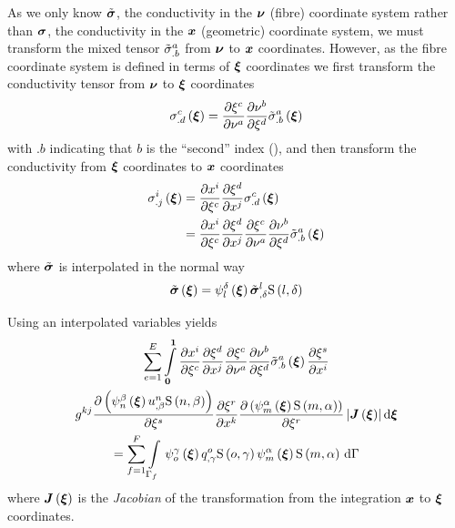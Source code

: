 As we only know $\tilde{ \boldsymbol{\mathit{ \sigma }} }$, the conductivity in the 
$ \boldsymbol{\nu} $ (fibre) coordinate system rather than $ \boldsymbol{\mathit{ \sigma }} $, the
conductivity in the $ \boldsymbol{x} $ (geometric) coordinate system, we must transform the mixed
tensor ${\tilde{ \sigma }}^{a}_{.b}$ from $ \boldsymbol{\nu} $ to $ \boldsymbol{x} $ coordinates. However, as the
fibre coordinate system is defined in terms of $ \boldsymbol{\xi} $ coordinates we
first transform the conductivity tensor from $ \boldsymbol{\nu} $ to $ \boldsymbol{\xi} $
coordinates \ie
\begin{equation}
    \sigma ^{c}_{.d}\left(  \boldsymbol{\xi}  \right) = \dfrac{\partial \xi^{c}}{\partial \nu^{a}}  \dfrac{\partial \nu^{b}}{\partial \xi^{d}} 
   {\tilde{ \sigma }}^{a}_{.b}\left(  \boldsymbol{\xi}  \right) 
\end{equation}
with $.b$ indicating that $b$ is the ``second'' index (),
and then transform the conductivity from $ \boldsymbol{\xi} $ coordinates to
$ \boldsymbol{x} $ coordinates \ie
\begin{equation}
  \begin{split}
      \sigma ^{i}_{.j}\left(  \boldsymbol{\xi}  \right)  &=
     \dfrac{\partial x^{i}}{\partial \xi^{c}}  \dfrac{\partial \xi^{d}}{\partial x^{j}} 
     { \sigma }^{c}_{.d}\left(  \boldsymbol{\xi}  \right)  \\
    &=  \dfrac{\partial x^{i}}{\partial \xi^{c}}  \dfrac{\partial \xi^{d}}{\partial x^{j}}  \dfrac{\partial \xi^{c}}{\partial \nu^{a}}  \dfrac{\partial \nu^{b}}{\partial \xi^{d}}  {\tilde{ \sigma }}^{a}_{.b}\left(  \boldsymbol{\xi}  \right) 
  \end{split}
\end{equation}
where $\tilde{ \boldsymbol{\mathit{ \sigma }} }$ is interpolated in the normal way \ie
\begin{equation}
   \tilde{ \boldsymbol{\mathit{ \sigma }} }\left(  \boldsymbol{\xi}  \right) 
  =   \psi_{l}^{\delta} \left(  \boldsymbol{\xi}  \right)    {\tilde{ \boldsymbol{\mathit{ \sigma }} }}^{l} _{,\delta} 
     \mathrm{S} \left( l,\delta \right)  
\end{equation}

Using an interpolated variables yields
\begin{multline}
  \dsum_{e=1}^{E}\dintl{\vectr{0}}{\vectr{1}}\delby{x^{i}}{\xi^{c}}
    \delby{\xi^{d}}{x^{j}}\delby{\xi^{c}}{\nu^{a}}
    \delby{\nu^{b}}{\xi^{d}}\fnof{{\tilde{\conductivitytensorsymbol}}^{a}_{.b}}{\vectr{\xi}}\delby{\xi^{s}}{x^{i}} \\
    \generalmetrictensorsymbol^{kj}\delby{\pbrac{\gbfn{n}{\beta}{\vectr{\xi}}\nodedof{u}{n}{\beta}\gsf{n}{\beta}}}{\xi^{s}}
    \delby{\xi^{r}}{x^{k}}\delby{\pbrac{\gbfn{m}{\alpha}{\vectr{\xi}}\gsf{m}{\alpha}}}{\xi^{r}}
    \abs{\fnof{\matr{J}}{\vectr{\xi}}}\exteriorderiv{\vectr{\xi}} \\ 
  = \dsum_{f=1}^{F}\gint{\Gamma_{f}}{}{\gbfn{o}{\gamma}{\vectr{\xi}}\nodedof{q}{o}{\gamma}
    \gsf{o}{\gamma}\gbfn{m}{\alpha}{\vectr{\xi}}\gsf{m}{\alpha}}{\Gamma}
\end{multline}
where $\fnof{\matr{J}}{\vectr{\xi}}$ is the \emph{Jacobian} of the
transformation from the integration $ \boldsymbol{x} $ to $ \boldsymbol{\xi} $ coordinates.

